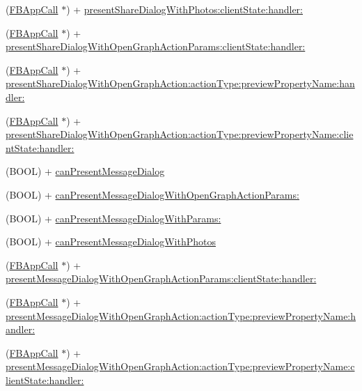 \begin{DoxyCompactItemize}
\item 
(\hyperlink{interfaceFBAppCall}{F\+B\+App\+Call} $\ast$) + \hyperlink{interfaceFBDialogs_abc4827f34c1e7e82b34216e6b9330cd8}{present\+Share\+Dialog\+With\+Photos\+:client\+State\+:handler\+:}
\item 
(\hyperlink{interfaceFBAppCall}{F\+B\+App\+Call} $\ast$) + \hyperlink{interfaceFBDialogs_a2fd765d39b1e4e4a9d4252762694b2b9}{present\+Share\+Dialog\+With\+Open\+Graph\+Action\+Params\+:client\+State\+:handler\+:}
\item 
(\hyperlink{interfaceFBAppCall}{F\+B\+App\+Call} $\ast$) + \hyperlink{interfaceFBDialogs_a17f88dc21a7f13474d310e4dd3e0d781}{present\+Share\+Dialog\+With\+Open\+Graph\+Action\+:action\+Type\+:preview\+Property\+Name\+:handler\+:}
\item 
(\hyperlink{interfaceFBAppCall}{F\+B\+App\+Call} $\ast$) + \hyperlink{interfaceFBDialogs_ad40b913195e68f5449fb0afab6c5a4b5}{present\+Share\+Dialog\+With\+Open\+Graph\+Action\+:action\+Type\+:preview\+Property\+Name\+:client\+State\+:handler\+:}
\item 
(B\+O\+OL) + \hyperlink{interfaceFBDialogs_aa41db27dd00b0c59e01d45f72b9045aa}{can\+Present\+Message\+Dialog}
\item 
(B\+O\+OL) + \hyperlink{interfaceFBDialogs_abc596dd117701ceb160dd63db514cf11}{can\+Present\+Message\+Dialog\+With\+Open\+Graph\+Action\+Params\+:}
\item 
(B\+O\+OL) + \hyperlink{interfaceFBDialogs_a81544299ca98179464ec34fc0e8d12b7}{can\+Present\+Message\+Dialog\+With\+Params\+:}
\item 
(B\+O\+OL) + \hyperlink{interfaceFBDialogs_ac10e310c30d763c7885c11fb44ac4924}{can\+Present\+Message\+Dialog\+With\+Photos}
\item 
(\hyperlink{interfaceFBAppCall}{F\+B\+App\+Call} $\ast$) + \hyperlink{interfaceFBDialogs_a5bca1ea62e067e9bdb417526be737bb7}{present\+Message\+Dialog\+With\+Open\+Graph\+Action\+Params\+:client\+State\+:handler\+:}
\item 
(\hyperlink{interfaceFBAppCall}{F\+B\+App\+Call} $\ast$) + \hyperlink{interfaceFBDialogs_a0f030b33a0565ec590e4abe56e147dc0}{present\+Message\+Dialog\+With\+Open\+Graph\+Action\+:action\+Type\+:preview\+Property\+Name\+:handler\+:}
\item 
(\hyperlink{interfaceFBAppCall}{F\+B\+App\+Call} $\ast$) + \hyperlink{interfaceFBDialogs_abcc422b112c828ff673681fbf4d7ccc1}{present\+Message\+Dialog\+With\+Open\+Graph\+Action\+:action\+Type\+:preview\+Property\+Name\+:client\+State\+:handler\+:}
\item 

\end{DoxyCompactItemize}
